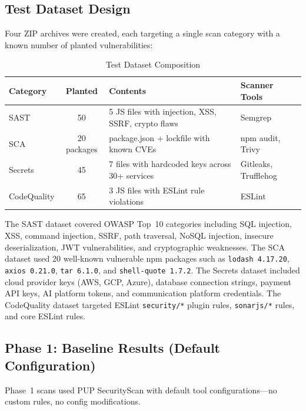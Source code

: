\documentclass[12pt,a4paper]{report}
\begin{document}
\subsection{Test Dataset Design}

Four ZIP archives were created, each targeting a single scan category with a known number of planted vulnerabilities:

\begin{table}[H]
\centering
\caption{Test Dataset Composition}
\label{tab:test_dataset}
\begin{tabular}{|l|c|l|l|}
\hline
\textbf{Category} & \textbf{Planted} & \textbf{Contents} & \textbf{Scanner Tools} \\
\hline
SAST & 50 & 5 JS files with injection, XSS, SSRF, crypto flaws & Semgrep \\
\hline
SCA & 20 packages & package.json + lockfile with known CVEs & npm audit, Trivy \\
\hline
Secrets & 45 & 7 files with hardcoded keys across 30+ services & Gitleaks, Trufflehog \\
\hline
CodeQuality & 65 & 3 JS files with ESLint rule violations & ESLint \\
\hline
\end{tabular}
\end{table}

The SAST dataset covered OWASP Top~10 categories including SQL injection, XSS, command injection, SSRF, path traversal, NoSQL injection, insecure deserialization, JWT vulnerabilities, and cryptographic weaknesses. The SCA dataset used 20 well-known vulnerable npm packages such as \texttt{lodash~4.17.20}, \texttt{axios~0.21.0}, \texttt{tar~6.1.0}, and \texttt{shell-quote~1.7.2}. The Secrets dataset included cloud provider keys (AWS, GCP, Azure), database connection strings, payment API keys, AI platform tokens, and communication platform credentials. The CodeQuality dataset targeted ESLint \texttt{security/*} plugin rules, \texttt{sonarjs/*} rules, and core ESLint rules.

\subsection{Phase 1: Baseline Results (Default Configuration)}

Phase~1 scans used PUP SecurityScan with default tool configurations---no custom rules, no config modifications.
\end{document}
